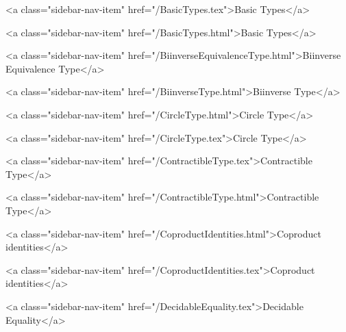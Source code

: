           <a class="sidebar-nav-item" href="/BasicTypes.tex">Basic Types</a>
        
      
    
      
        
          <a class="sidebar-nav-item" href="/BasicTypes.html">Basic Types</a>
        
      
    
      
        
          <a class="sidebar-nav-item" href="/BiinverseEquivalenceType.html">Biinverse Equivalence Type</a>
        
      
    
      
        
          <a class="sidebar-nav-item" href="/BiinverseType.html">Biinverse Type</a>
        
      
    
      
        
          <a class="sidebar-nav-item" href="/CircleType.html">Circle Type</a>
        
      
    
      
        
          <a class="sidebar-nav-item" href="/CircleType.tex">Circle Type</a>
        
      
    
      
        
          <a class="sidebar-nav-item" href="/ContractibleType.tex">Contractible Type</a>
        
      
    
      
        
          <a class="sidebar-nav-item" href="/ContractibleType.html">Contractible Type</a>
        
      
    
      
        
          <a class="sidebar-nav-item" href="/CoproductIdentities.html">Coproduct identities</a>
        
      
    
      
        
          <a class="sidebar-nav-item" href="/CoproductIdentities.tex">Coproduct identities</a>
        
      
    
      
        
          <a class="sidebar-nav-item" href="/DecidableEquality.tex">Decidable Equality</a>
        
      
    
